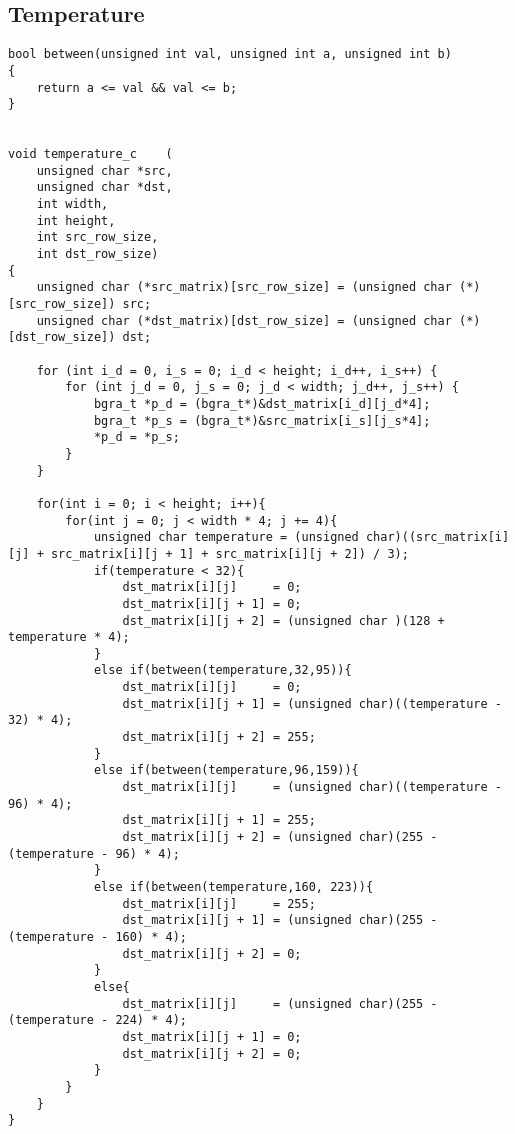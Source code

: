\subsection{Temperature}

\begin{codesnippet}
\begin{verbatim}
bool between(unsigned int val, unsigned int a, unsigned int b)
{
	return a <= val && val <= b;
}


void temperature_c    (
	unsigned char *src,
	unsigned char *dst,
	int width,
	int height,
	int src_row_size,
	int dst_row_size)
{
    unsigned char (*src_matrix)[src_row_size] = (unsigned char (*)[src_row_size]) src;
    unsigned char (*dst_matrix)[dst_row_size] = (unsigned char (*)[dst_row_size]) dst;

    for (int i_d = 0, i_s = 0; i_d < height; i_d++, i_s++) {
        for (int j_d = 0, j_s = 0; j_d < width; j_d++, j_s++) {
            bgra_t *p_d = (bgra_t*)&dst_matrix[i_d][j_d*4];
            bgra_t *p_s = (bgra_t*)&src_matrix[i_s][j_s*4];
            *p_d = *p_s;
        }
    }

    for(int i = 0; i < height; i++){
        for(int j = 0; j < width * 4; j += 4){
            unsigned char temperature = (unsigned char)((src_matrix[i][j] + src_matrix[i][j + 1] + src_matrix[i][j + 2]) / 3);
            if(temperature < 32){
                dst_matrix[i][j]     = 0;
                dst_matrix[i][j + 1] = 0;
                dst_matrix[i][j + 2] = (unsigned char )(128 + temperature * 4);
            }
            else if(between(temperature,32,95)){
                dst_matrix[i][j] 	 = 0;
                dst_matrix[i][j + 1] = (unsigned char)((temperature - 32) * 4);
                dst_matrix[i][j + 2] = 255;
            }
            else if(between(temperature,96,159)){
                dst_matrix[i][j] 	 = (unsigned char)((temperature - 96) * 4);
                dst_matrix[i][j + 1] = 255;
                dst_matrix[i][j + 2] = (unsigned char)(255 - (temperature - 96) * 4);
            }
            else if(between(temperature,160, 223)){
                dst_matrix[i][j] 	 = 255;
                dst_matrix[i][j + 1] = (unsigned char)(255 - (temperature - 160) * 4);
                dst_matrix[i][j + 2] = 0;
            }
            else{
                dst_matrix[i][j] 	 = (unsigned char)(255 - (temperature - 224) * 4);
                dst_matrix[i][j + 1] = 0;
                dst_matrix[i][j + 2] = 0;
            }
        }
    }
}
\end{verbatim}
\end{codesnippet}

